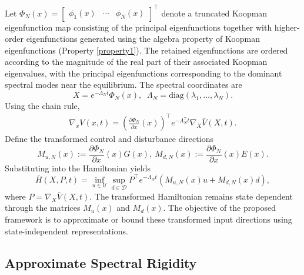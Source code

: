 \documentclass[letterpaper, 10 pt, conference]{ieeeconf}
\theoremstyle{plain}
\theoremstyle{definition}
\begin{document}
Let
$
\Phi_N(x)=\begin{bmatrix}
\phi_1(x) & \cdots & \phi_N(x)
\end{bmatrix}^\top
$
denote a truncated Koopman eigenfunction map consisting of the principal eigenfunctions together with higher-order eigenfunctions generated using the algebra property of Koopman eigenfunctions (Property \ref{property1}). 
{\color{black}The retained eigenfunctions are ordered according to the magnitude of the real part of their associated Koopman eigenvalues, with the principal eigenfunctions corresponding to the dominant spectral modes near the equilibrium.}
The spectral coordinates are
\[
X=e^{-\Lambda_N t}\Phi_N(x),
\;\;\Lambda_N=\mathrm{diag}(\lambda_1,\dots,\lambda_N).
\]
Using the chain rule,
{\color{black}
\begin{align*}
    \nabla_x V(x,t)
    =
    \left(\frac{\partial \Phi_N}{\partial x}(x)\right)^\top
    e^{-\Lambda_N^\top t}
    \nabla_X \bar V(X,t).
\end{align*}
}
Define the transformed control and disturbance directions
\begin{equation}
    M_{u,N}(x):=
    \frac{\partial\Phi_N}{\partial x}(x)G(x),
    \
    M_{d,N}(x):=
    \frac{\partial\Phi_N}{\partial x}(x)E(x).
    \label{eq:MuMd_def}
\end{equation}
Substituting into the Hamiltonian yields
\begin{equation}
    \bar H(X,P,t)
    =
    \inf_{u\in\mathcal U}
    \sup_{d\in\mathcal D}
    P^\top e^{-\Lambda_N t}
    \left(
    M_{u,N}(x)u + M_{d,N}(x)d
    \right),
    \label{eq:Hbar_general}
\end{equation}
where $P=\nabla_X \bar V(X,t)$. 
The transformed Hamiltonian remains state dependent through the matrices $M_u(x)$ and $M_d(x)$.
The objective of the proposed framework is to approximate or bound these transformed input directions using state-independent representations.


\subsection{Approximate Spectral Rigidity}\label{sec:approx_rigidity}
\end{document}
